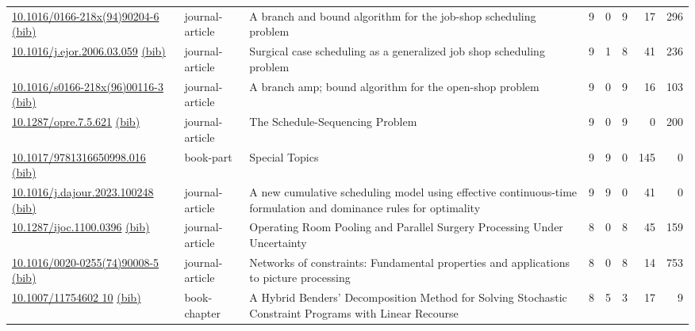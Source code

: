 {\begin{longtable}{p{5cm}lp{11cm}rrrrr}
\href{http://dx.doi.org/10.1016/0166-218x(94)90204-6}{10.1016/0166-218x(94)90204-6} \href{https://www.doi2bib.org/bib/10.1016/0166-218x(94)90204-6}{(bib)} & journal-article & A branch and bound algorithm for the job-shop scheduling problem & 9 & 0 & 9 & 17 & 296 \\
\href{http://dx.doi.org/10.1016/j.ejor.2006.03.059}{10.1016/j.ejor.2006.03.059} \href{https://www.doi2bib.org/bib/10.1016/j.ejor.2006.03.059}{(bib)} & journal-article & Surgical case scheduling as a generalized job shop scheduling problem & 9 & 1 & 8 & 41 & 236 \\
\href{http://dx.doi.org/10.1016/s0166-218x(96)00116-3}{10.1016/s0166-218x(96)00116-3} \href{https://www.doi2bib.org/bib/10.1016/s0166-218x(96)00116-3}{(bib)} & journal-article & A branch  amp; bound algorithm for the open-shop problem & 9 & 0 & 9 & 16 & 103 \\
\href{http://dx.doi.org/10.1287/opre.7.5.621}{10.1287/opre.7.5.621} \href{https://www.doi2bib.org/bib/10.1287/opre.7.5.621}{(bib)} & journal-article & The Schedule-Sequencing Problem & 9 & 0 & 9 & 0 & 200 \\
\href{http://dx.doi.org/10.1017/9781316650998.016}{10.1017/9781316650998.016} \href{https://www.doi2bib.org/bib/10.1017/9781316650998.016}{(bib)} & book-part & Special Topics & 9 & 9 & 0 & 145 & 0 \\
\href{http://dx.doi.org/10.1016/j.dajour.2023.100248}{10.1016/j.dajour.2023.100248} \href{https://www.doi2bib.org/bib/10.1016/j.dajour.2023.100248}{(bib)} & journal-article & A new cumulative scheduling model using effective continuous-time formulation and dominance rules for optimality & 9 & 9 & 0 & 41 & 0 \\
\href{http://dx.doi.org/10.1287/ijoc.1100.0396}{10.1287/ijoc.1100.0396} \href{https://www.doi2bib.org/bib/10.1287/ijoc.1100.0396}{(bib)} & journal-article & Operating Room Pooling and Parallel Surgery Processing Under Uncertainty & 8 & 0 & 8 & 45 & 159 \\
\href{http://dx.doi.org/10.1016/0020-0255(74)90008-5}{10.1016/0020-0255(74)90008-5} \href{https://www.doi2bib.org/bib/10.1016/0020-0255(74)90008-5}{(bib)} & journal-article & Networks of constraints: Fundamental properties and applications to picture processing & 8 & 0 & 8 & 14 & 753 \\
\href{http://dx.doi.org/10.1007/11754602_10}{10.1007/11754602 10} \href{https://www.doi2bib.org/bib/10.1007/11754602_10}{(bib)} & book-chapter & A Hybrid Benders' Decomposition Method for Solving Stochastic Constraint Programs with Linear Recourse & 8 & 5 & 3 & 17 & 9 \\

\end{longtable}}
